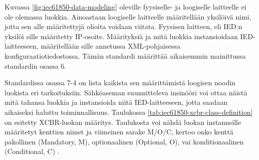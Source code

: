 Kuvassa \ref{fig:iec61850-data-modeling} oleville fyysiselle- ja loogiselle laitteelle ei ole olemassa luokkia. Ainoastaan loogiselle laitteelle määritellään yksilöivä nimi, jotta sen alle määritettyjä olioita voidaan viitata. Fyysisen laitteen, eli IED:n yksilöi sille määritetty IP-osoite. Määrityksiä ja mitä luokkia instansioidaan IED-laitteeseen, määritellään sille annetussa XML-pohjaisessa konfiguraatiotiedostossa. Tämän standardi määrittää aikaisemmin mainittussa standardin osassa 6.

Standardissa osassa 7-4 on lista kaikista sen määrittämistä loogisen noodin luokista eri tarkoituksiin. Sähköaseman suunnitteleva insinööri voi ottaa näistä mitä tahansa luokkia ja instansioida niitä IED-laitteeseen, jotta saadaan aikaiseksi haluttu toiminnallisuus. Taulukossa \ref{tab:iec61850-xcbr-class-definition} on esitetty XCBR-luokan määritys. Taulukosta voi nähdä luokan instannsille määritetyt kenttien nimet ja viimeinen sarake M/O/C, kertoo onko kenttä pakollinen (Mandatory, M), optionaalinen (Optional, O), vai konditionaalinen (Conditional, C) \cite[s.~106]{IEC61850-7-4}.

